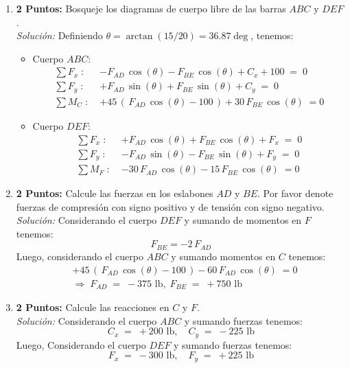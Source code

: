 \documentclass[ a4paper, twoside, 11pt]{article}
\begin{document}
\begin{problem}
\begin{enumerate}[label=\textbf{\alph*)}]
\item \textbf{2 Puntos:} Bosqueje los diagramas de cuerpo libre de las barras $ABC$ y $DEF$. \\[1ex] \emph{Soluci\'on:} Definiendo $\theta = \arctan( 15 / 20 ) = 36.87\deg$, tenemos: 
\begin{itemize}
\item Cuerpo $ABC$: 
\begin{align*}
\sum F_x \; \colon \;
& -F_{AD} \, \cos(\theta) - F_{BE} \, \cos(\theta) + C_x + 100 \; = \; 0 \\[1ex]
\sum F_y \; \colon \;
& +F_{AD} \, \sin(\theta) + F_{BE} \, \sin(\theta) + C_y \; = \; 0 \\[1ex]
\sum M_C \; \colon \;
& +45 \, ( \, F_{AD} \, \cos(\theta) - 100 \, ) + 30 \, F_{BE} \, \cos(\theta) \; = 0
\end{align*}
\item Cuerpo $DEF$: 
\begin{align*}
\sum F_x \; \colon \;
& +F_{AD} \, \cos(\theta) + F_{BE} \, \cos(\theta) + F_x \; = \; 0 \\[1ex]
\sum F_y \; \colon \;
& -F_{AD} \, \sin(\theta) - F_{BE} \, \sin(\theta) + F_y \; = \; 0 \\[1ex]
\sum M_F \; \colon \;
& -30 \, F_{AD} \, \cos(\theta) - 15 \, F_{BE} \, \cos(\theta) \; = 0
\end{align*}
\end{itemize}

\item \textbf{2 Puntos:} Calcule las fuerzas en los eslabones $AD$ y $BE$. Por favor denote fuerzas de compresi\'on con signo positivo y de tensi\'on con signo negativo. \\[1ex] \emph{Soluci\'on:} Considerando el cuerpo $DEF$ y sumando de momentos en $F$ tenemos: 
\[
F_{BE} = -2 \, F_{AD}
\]
Luego, considerando el cuerpo $ABC$ y sumando momentos en $C$ tenemos: 
\begin{align*}
& +45 \, ( \, F_{AD} \, \cos(\theta) - 100 \, ) - 60 \, F_{AD} \, \cos(\theta) \; = 0 \\
& \Longrightarrow \;
F_{AD} \; = \; -375 \text{ lb}, \;
F_{BE} \; = \; +750 \text{ lb}
\end{align*}

\item \textbf{2 Puntos:} Calcule las reacciones en $C$ y $F$. \\[1ex] \emph{Soluci\'on:} Considerando el cuerpo $ABC$ y sumando fuerzas tenemos: 
\[
C_x \; = \; +200 \text{ lb}, \quad
C_y \; = \; -225 \text{ lb}
\]
Luego, Considerando el cuerpo $DEF$ y sumando fuerzas tenemos: 
\[
F_x \; = \; -300 \text{ lb}, \quad
F_y \; = \; +225 \text{ lb}
\]

\end{enumerate}

\end{problem}
\fullskip
\end{document}
